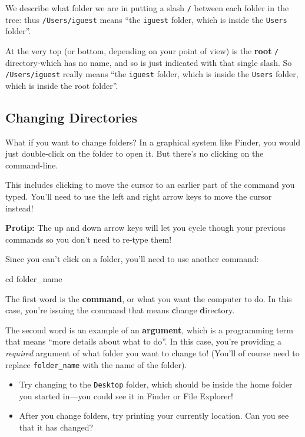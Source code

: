 \documentclass[]{book}
\newenvironment{Shaded}{\begin{snugshade}}{\end{snugshade}}
\newcommand{\BuiltInTok}[1]{#1}
\newcommand{\NormalTok}[1]{#1}
\theoremstyle{definition}
\theoremstyle{definition}
\theoremstyle{remark}
\begin{document}
We describe what folder we are in putting a slash \texttt{/} between
each folder in the tree: thus \texttt{/Users/iguest} means ``the
\texttt{iguest} folder, which is inside the \texttt{Users} folder''.

At the very top (or bottom, depending on your point of view) is the
\textbf{root} \texttt{/} directory‐which has no name, and so is just
indicated with that single slash. So \texttt{/Users/iguest} really means
``the \texttt{iguest} folder, which is inside the \texttt{Users} folder,
which is inside the root folder''.

\subsection{Changing Directories}\label{changing-directories}

What if you want to change folders? In a graphical system like Finder,
you would just double-click on the folder to open it. But there's no
clicking on the command-line.

This includes clicking to move the cursor to an earlier part of the
command you typed. You'll need to use the left and right arrow keys to
move the cursor instead!

\textbf{Protip:} The up and down arrow keys will let you cycle though
your previous commands so you don't need to re-type them!

Since you can't click on a folder, you'll need to use another command:

\begin{Shaded}
\begin{Highlighting}[]
\BuiltInTok{cd}\NormalTok{ folder_name}
\end{Highlighting}
\end{Shaded}

The first word is the \textbf{command}, or what you want the computer to
do. In this case, you're issuing the command that means \textbf{c}hange
\textbf{d}irectory.

The second word is an example of an \textbf{argument}, which is a
programming term that means ``more details about what to do''. In this
case, you're providing a \emph{required} argument of what folder you
want to change to! (You'll of course need to replace
\texttt{folder\_name} with the name of the folder).

\begin{itemize}
\item
  Try changing to the \texttt{Desktop} folder, which should be inside
  the home folder you started in---you could see it in Finder or File
  Explorer!
\item
  After you change folders, try printing your currently location. Can
  you see that it has changed?
\end{itemize}
\end{document}
